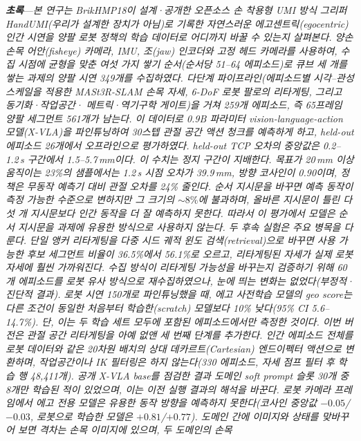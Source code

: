 \documentclass[conference,10pt]{IEEEtran}
\newcommand{\mm}{\,mm\xspace}
\newcounter{rpart}
\newcommand{\reportpart}[3]{\clearpage\stepcounter{rpart}\setcounter{section}{0}%
  \twocolumn[{\centering{\LARGE\bfseries #1\par}\vspace{1.5mm}{\large #2\par}\vspace{3mm}\hrule\vspace{5mm}}]\label{#3}}
\newcommand{\partabstract}[1]{\noindent\textbf{\textit{초록}}---\textit{#1}\par\medskip}
\begin{document}
\reportpart{제1부}{큐브 삼단 쌓기(양팔)}{part:p1}
\partabstract{본 연구는 BrikHMP18이 설계·공개한 오픈소스 손 착용형 UMI 방식 그리퍼 HandUMI(우리가 설계한 장치가 아님)로 기록한 자연스러운 에고센트릭(egocentric) 인간 시연을 양팔 로봇 정책의 학습
데이터로 어디까지 바꿀 수 있는지 살펴본다. 양손 손목 어안(fisheye) 카메라, IMU, 조(jaw) 인코더와 고정 헤드 카메라를 사용하여,
수집 시점에 균형을 맞춘 여섯 가지 쌓기 순서(순서당 51--64 에피소드)로 큐브 세 개를 쌓는 과제의 양팔 시연 349개를 수집하였다.
다단계 파이프라인(에피소드별 시각--관성 스케일을 적용한 MASt3R-SLAM 손목 자세, 6-DoF 로봇 팔로의 리타게팅, 그리고 동기화·작업공간·
메트릭·역기구학 게이트)을 거쳐 259개 에피소드, 즉 65프레임 양팔 세그먼트 561개가 남는다. 이 데이터로 0.9B 파라미터
vision-language-action 모델(X-VLA)을 파인튜닝하여 30스텝 관절 공간 액션 청크를 예측하게 하고, held-out 에피소드 26개에서
오프라인으로 평가하였다. held-out TCP 오차의 중앙값은 0.2--1.2\,s 구간에서 1.5--5.7\mm{}이다. 이 수치는 정지 구간이 지배한다.
목표가 20\mm 이상 움직이는 23\%의 샘플에서는 1.2\,s 시점 오차가 39.9\mm, 방향 코사인이 0.90이며, 정책은 무동작 예측기 대비 관절
오차를 24\% 줄인다. 순서 지시문을 바꾸면 예측 동작이 측정 가능한 수준으로 변하지만 그 크기의 ${\sim}8\%$에 불과하며, 올바른
지시문이 틀린 다섯 개 지시문보다 인간 동작을 더 잘 예측하지 못한다. 따라서 이 평가에서 모델은 순서 지시문을 과제에 유용한
방식으로 사용하지 않는다.
두 후속 실험은 주요 병목을 다룬다. 단일 앵커 리타게팅을 다중 시드 궤적 윈도 검색(retrieval)으로 바꾸면 사용 가능한 후보 세그먼트
비율이 36.5\%에서 56.1\%로 오르고, 리타게팅된 자세가 실제 로봇 자세에 훨씬 가까워진다. 수집 방식이 리타게팅 가능성을 바꾸는지
검증하기 위해 60개 에피소드를 로봇 유사 방식으로 재수집하였으나, 눈에 띄는 변화는 없었다(부정적·진단적 결과). 로봇 시연 150개로
파인튜닝했을 때, 에고 사전학습 모델의 geo score는 다른 조건이 동일한 처음부터 학습한(scratch) 모델보다 10\% 낮다(95\% CI 5.6--14.7\%).
단, 이는 두 학습 세트 모두에 포함된 에피소드에서만 측정한 것이다.
이번 버전은 관절 공간 리타게팅을 아예 없앤 세 번째 단계를 추가한다. 인간 에피소드 전체를 로봇 데이터와 같은 20차원 배치의
상대 데카르트(Cartesian) 엔드이펙터 액션으로 변환하며, 작업공간이나 IK 필터링은 하지 않는다(330 에피소드, 자세 점프 필터 후
학습 행 48{,}411개). 공개 X-VLA base를 점검한 결과 도메인 soft prompt 슬롯 30개 중 8개만 학습된 적이 있었으며, 이는 이전 실행
결과의 해석을 바꾼다. 로봇 카메라 프레임에서 에고 전용 모델은 유용한 동작 방향을 예측하지 못한다(코사인 중앙값 $-0.05$/$-0.03$,
로봇으로 학습한 모델은 $+0.81$/$+0.77$). 도메인 간에 이미지와 상태를 맞바꾸어 보면 격차는 손목 이미지에 있으며, 두 도메인의 손목
}
\end{document}
